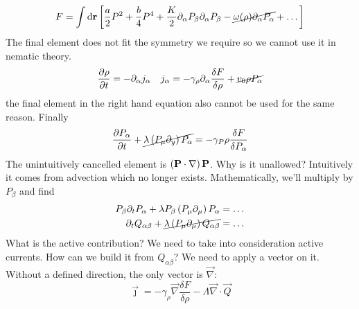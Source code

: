 \begin{equation}
    F = \int \mathop{}\!\mathrm{d} \mathbf{r}\left[\frac{a}{2}P^2+\frac{b}{4}P^4+\frac{K}{2}\partial_\alpha P_\beta\partial_\alpha P_\beta-\cancel{\omega(\rho)\partial_\alpha P_\alpha} + \dots\right]
\end{equation}
The final element does not fit the symmetry we require so we cannot use it in nematic theory.
\begin{align}
    \diffp{\rho}{t} = -\partial_\alpha j_\alpha && j_\alpha = -\gamma_\rho\partial_\alpha\frac{\delta F}{\delta\rho} + \cancel{v_0\rho P_\alpha}
\end{align}
the final element in the right hand equation also cannot be used for the same reason. Finally
\begin{equation}
    \diffp{P_\alpha}{t} + \cancel{\lambda \ins{P_\mu\partial_y}P_\alpha} = -\gamma_P\rho \frac{\delta F}{\delta P_\alpha}
\end{equation}
The unintuitively cancelled element is \(\left(\mathbf{P}\cdot\nabla\right)\mathbf{P}\). Why is it unallowed? Intuitively it comes from advection which no longer exists. Mathematically, we'll multiply by \(P_\beta \) and find
\begin{align}
    P_\beta\partial_t P_\alpha + \lambda P_\beta\left(P_\mu \partial_\mu\right)P_\alpha = \dots \\
    \partial_t Q_{\alpha\beta} + \cancel{\lambda\left(P_\mu\partial_\mu\right)Q_{\alpha\beta}} = \dots
\end{align}
What is the active contribution? We need to take into consideration active currents. How can we build it from \(Q_{\alpha\beta}\)? We need to apply a vector on it. Without a defined direction, the only vector is \(\vec{\nabla}\):
\begin{equation}
    \vec{\jmath} = -\gamma_\rho\vec{\nabla}\frac{\delta F}{\delta\rho}-\Lambda\vec{\nabla}\cdot\vec{Q}
\end{equation}